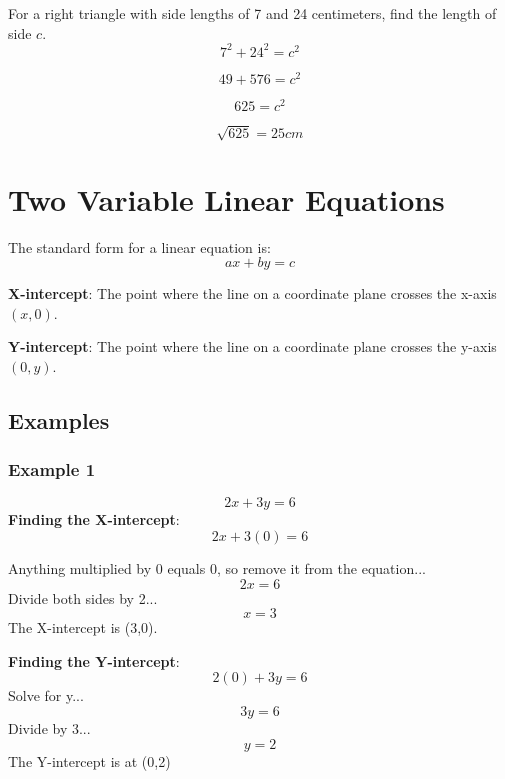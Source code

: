 \documentclass[letterpaper, 10pt]{article}
\begin{document}
For a right triangle with side lengths of 7 and 24 centimeters, find the length of side $c$.
$$
7^2 + 24^2 = c^2
$$

$$
49 + 576 = c^2
$$

$$
625 = c^2
$$

$$
\sqrt{625} = 25 cm
$$

\section{Two Variable Linear Equations}
The standard form for a linear equation is: 
	$$
	ax + by = c
	$$

\noindent \textbf{X-intercept}: The point where the line on a coordinate plane crosses the x-axis $(x,0)$.

\noindent \textbf{Y-intercept}: The point where the line on a coordinate plane crosses the y-axis $(0,y)$.

\subsection{Examples}
\subsubsection{Example 1}
$$2x + 3y = 6$$
\textbf{Finding the X-intercept}:
$$2x + 3(0) = 6$$

Anything multiplied by 0 equals 0, so remove it from the equation...
$$2x = 6$$
Divide both sides by 2...
$$x = 3$$
The X-intercept is (3,0).

\textbf{Finding the Y-intercept}:
$$2(0) + 3y = 6$$
Solve for y...
$$3y = 6$$
Divide by 3...
$$y = 2$$
The Y-intercept is at (0,2)
\end{document}

